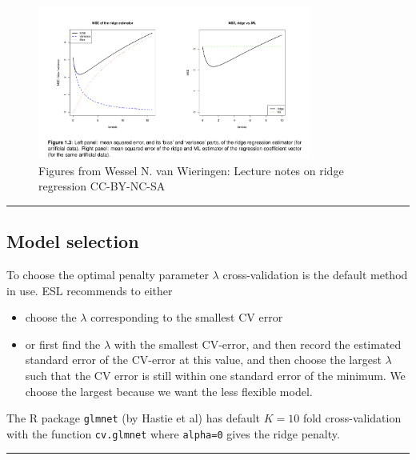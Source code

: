 \documentclass[
  letterpaper,
  DIV=11,
  numbers=noendperiod]{scrartcl}
\providecommand{\tightlist}{%
  \setlength{\itemsep}{0pt}\setlength{\parskip}{0pt}}\usepackage{longtable,booktabs,array}
\begin{document}
\begin{figure}

{\centering \includegraphics[width=0.8\textwidth,height=\textheight]{./WNvWFig13.jpg}

}

\caption{Figures from Wessel N. van Wieringen: Lecture notes on ridge
regression CC-BY-NC-SA}

\end{figure}

\begin{center}\rule{0.5\linewidth}{0.5pt}\end{center}

\hypertarget{model-selection}{%
\subsection{Model selection}\label{model-selection}}

To choose the optimal penalty parameter \(\lambda\) cross-validation is
the default method in use. ESL recommends to either

\begin{itemize}
\tightlist
\item
  choose the \(\lambda\) corresponding to the smallest CV error
\item
  or first find the \(\lambda\) with the smallest CV-error, and then
  record the estimated standard error of the CV-error at this value, and
  then choose the largest \(\lambda\) such that the CV error is still
  within one standard error of the minimum. We choose the largest
  because we want the less flexible model.
\end{itemize}

The R package \texttt{glmnet} (by Hastie et al) has default \(K=10\)
fold cross-validation with the function \texttt{cv.glmnet} where
\texttt{alpha=0} gives the ridge penalty.

\begin{center}\rule{0.5\linewidth}{0.5pt}\end{center}
\end{document}

